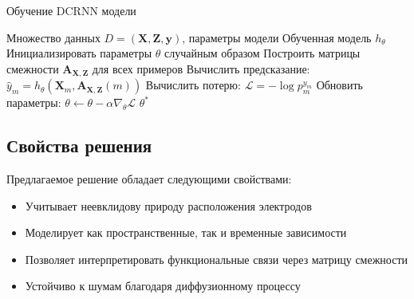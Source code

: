 \documentclass[12pt, twoside]{article}
\begin{document}
\begin{algorithm}[H]
\caption{Обучение DCRNN модели}
\begin{algorithmic}[1]
\REQUIRE Множество данных $D = (\mathbf{X}, \mathbf{Z}, \mathbf{y})$, параметры модели
\ENSURE Обученная модель $h_\theta$
\STATE Инициализировать параметры $\theta$ случайным образом
\STATE Построить матрицы смежности $\mathbf{A}_{\mathbf{X}, \mathbf{Z}}$ для всех примеров
        \STATE Вычислить предсказание: $\hat{y}_m = h_\theta(\mathbf{X}_m, \mathbf{A}_{\mathbf{X}, \mathbf{Z}}(m))$
        \STATE Вычислить потерю: $\mathcal{L} = -\log p_m^{y_m}$
        \STATE Обновить параметры: $\theta \leftarrow \theta - \alpha \nabla_\theta \mathcal{L}$
    \ENDFOR
\ENDFOR
\RETURN $\theta^*$
\end{algorithmic}
\end{algorithm}

\subsection{Свойства решения}

Предлагаемое решение обладает следующими свойствами:
\begin{itemize}
    \item Учитывает неевклидову природу расположения электродов
    \item Моделирует как пространственные, так и временные зависимости
    \item Позволяет интерпретировать функциональные связи через матрицу смежности
    \item Устойчиво к шумам благодаря диффузионному процессу
\end{itemize}



\end{document}
